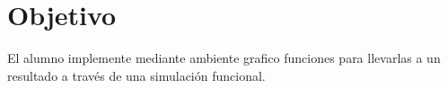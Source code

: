 \documentclass[../main.tex]{subfiles}
\begin{document}
\section{Objetivo}
El alumno implemente mediante ambiente grafico funciones para llevarlas a un 
resultado a través de una simulación funcional.
\end{document}
